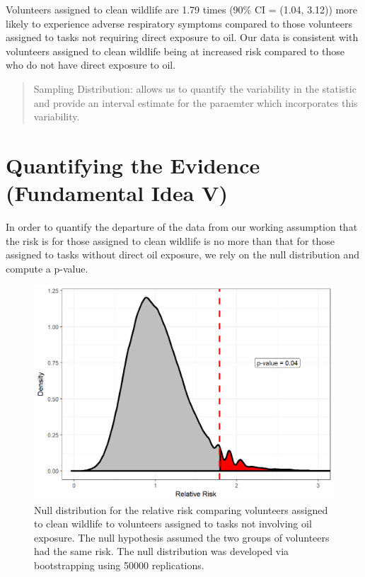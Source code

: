 \documentclass[]{book}
\theoremstyle{plain}
\theoremstyle{mydefn}
\theoremstyle{myexmpl}
\theoremstyle{remark}
\begin{document}
Volunteers assigned to clean wildlife are 1.79 times (90\% CI = (1.04,
3.12)) more likely to experience adverse respiratory symptoms compared
to those volunteers assigned to tasks not requiring direct exposure to
oil. Our data is consistent with volunteers assigned to clean wildlife
being at increased risk compared to those who do not have direct
exposure to oil.

\begin{quote}
Sampling Distribution: allows us to quantify the variability in the
statistic and provide an interval estimate for the paraemter which
incorporates this variability.
\end{quote}

\section{Quantifying the Evidence (Fundamental Idea
V)}\label{quantifying-the-evidence-fundamental-idea-v}

In order to quantify the departure of the data from our working
assumption that the risk is for those assigned to clean wildlife is no
more than that for those assigned to tasks without direct oil exposure,
we rely on the null distribution and compute a p-value.

\begin{figure}

{\centering \includegraphics[width=0.8\linewidth]{./Images/recaplanguage-null-distribution-1} 

}

\caption{Null distribution for the relative risk comparing volunteers assigned to clean wildlife to volunteers assigned to tasks not involving oil exposure.  The null hypothesis assumed the two groups of volunteers had the same risk.  The null distribution was developed via bootstrapping using 50000 replications.}\label{fig:recaplanguage-null-distribution}
\end{figure}
\end{document}
